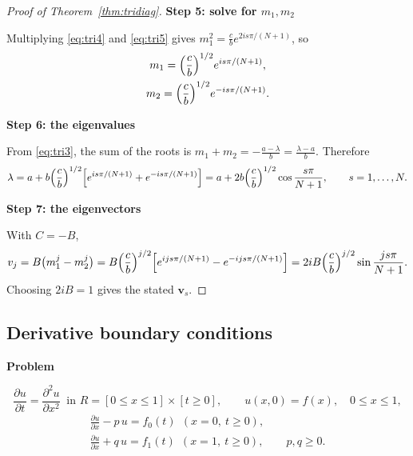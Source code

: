 \documentclass[11pt,a4paper]{article}
\numberwithin{equation}{section}
\theoremstyle{spacedplain}
\theoremstyle{spaceddefinition}
\theoremstyle{spacedremark}
\newcommand{\step}[1]{\par\addvspace{0.6em}\noindent\textbf{#1}\par\nobreak}
\newcommand{\pd}[2]{\frac{\partial #1}{\partial #2}}
\newcommand{\pdd}[2]{\frac{\partial^2 #1}{\partial #2^2}}
\begin{document}
\begin{proof}[Proof of Theorem~\ref{thm:tridiag}]
\step{Step 5: solve for \(m_1,m_2\)}
Multiplying \eqref{eq:tri4}
and \eqref{eq:tri5} gives \(m_1^2=\frac cb e^{2is\pi/(N+1)}\), so
\[
\begin{gathered}
  m_1=\Bigl(\frac cb\Bigr)^{1/2}e^{is\pi/(N+1)},
  \\
  m_2=\Bigl(\frac cb\Bigr)^{1/2}e^{-is\pi/(N+1)}.
\end{gathered}
\]

\step{Step 6: the eigenvalues}
From \eqref{eq:tri3}, the sum of
the roots is \(m_1+m_2=-\frac{a-\lambda}{b}=\frac{\lambda-a}b\).
Therefore
\[
  \lambda=a+b\Bigl(\frac cb\Bigr)^{1/2}
          \Bigl[e^{is\pi/(N+1)}+e^{-is\pi/(N+1)}\Bigr]
  =a+2b\Bigl(\frac cb\Bigr)^{1/2}\cos\frac{s\pi}{N+1},
  \qquad s=1,\dots,N.
\]

\step{Step 7: the eigenvectors}
With \(C=-B\),
\[
  v_j=B\bigl(m_1^j-m_2^j\bigr)
  =B\Bigl(\frac cb\Bigr)^{j/2}
    \Bigl[e^{ijs\pi/(N+1)}-e^{-ijs\pi/(N+1)}\Bigr]
  =2iB\Bigl(\frac cb\Bigr)^{j/2}\sin\frac{js\pi}{N+1}.
\]
Choosing \(2iB=1\) gives the stated \(\mathbf v_s\).
\end{proof}

\subsection{Derivative boundary conditions}

\step{Problem}

\[
  \pd ut=\pdd ux\ \text{ in } R=[0\le x\le1]\times[t\ge0],
  \qquad u(x,0)=f(x),\quad 0\le x\le1,
\]
\[
\begin{gathered}
  \pd ux-p\,u=f_0(t)\ \ (x=0,\ t\ge0),
  \\
  \pd ux+q\,u=f_1(t)\ \ (x=1,\ t\ge0),
  \qquad p,q\ge0.
\end{gathered}
\]
\end{document}
